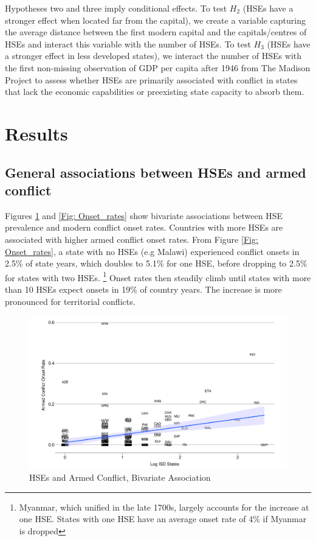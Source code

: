 Hypotheses two and three imply conditional effects. To test $H_2$ (HSEs have a stronger effect when located far from the capital), we create a variable capturing the average distance between the first modern capital and the capitals/centres of HSEs and interact this variable with the number of HSEs. To test $H_3$ (HSEs have a stronger effect in less developed states), we interact the number of HSEs with the
first non-missing observation of GDP per capita after 1946 from The Madison
Project to assess whether HSEs are primarily associated with conflict in states
that lack the economic capabilities or preexisting state capacity to absorb
them.   

\section{Results}

\subsection{General associations between HSEs and armed conflict}

Figures \ref{Fig: Main_Scatter} and \ref{Fig: Onset_rates} show bivariate
associations between HSE prevalence and modern conflict onset rates. Countries
with more HSEs are associated with higher armed conflict onset rates. From
Figure \ref{Fig: Onset_rates}, a state with no HSEs (e.g Malawi) experienced
conflict onsets in 2.5\% of state years, which doubles to 5.1\% for one HSE,
before dropping to 2.5\% for states with two HSEs. \footnote{Myanmar, which
unified in the late 1700s, largely accounts for the increase at one HSE. States
with one HSE have an average onset rate of 4\% if Myanmar is dropped} Onset
rates then steadily climb until states with more than 10 HSEs expect onsets in
19\% of country years. The increase is more pronounced for territorial
conflicts.

\begin{figure}[!htb]
\includegraphics[width=\textwidth,keepaspectratio]{img/hse_scatterplot.pdf}
\caption{HSEs and Armed Conflict, Bivariate Association} \label{Fig: Main_Scatter}
\end{figure}



